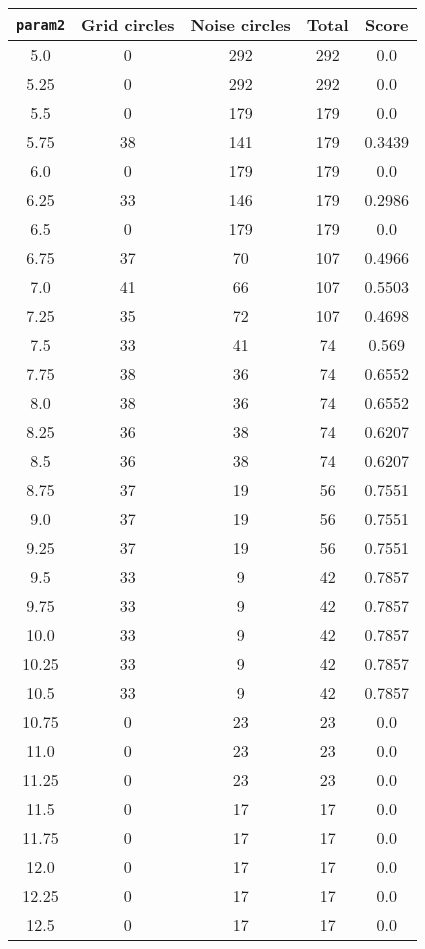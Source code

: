 \documentclass[letterpaper, 12pt]{article}
\begin{document}
\begin{longtable}{|c|c|c|c|c|}
\hline
\textbf{\texttt{param2}} & \textbf{Grid circles} & \textbf{Noise circles} & \textbf{Total} & \textbf{Score} \\
\hline
5.0 & 0 & 292 & 292 & 0.0 \\
\hline
5.25 & 0 & 292 & 292 & 0.0 \\
\hline
5.5 & 0 & 179 & 179 & 0.0 \\
\hline
5.75 & 38 & 141 & 179 & 0.3439 \\
\hline
6.0 & 0 & 179 & 179 & 0.0 \\
\hline
6.25 & 33 & 146 & 179 & 0.2986 \\
\hline
6.5 & 0 & 179 & 179 & 0.0 \\
\hline
6.75 & 37 & 70 & 107 & 0.4966 \\
\hline
7.0 & 41 & 66 & 107 & 0.5503 \\
\hline
7.25 & 35 & 72 & 107 & 0.4698 \\
\hline
7.5 & 33 & 41 & 74 & 0.569 \\
\hline
7.75 & 38 & 36 & 74 & 0.6552 \\
\hline
8.0 & 38 & 36 & 74 & 0.6552 \\
\hline
8.25 & 36 & 38 & 74 & 0.6207 \\
\hline
8.5 & 36 & 38 & 74 & 0.6207 \\
\hline
8.75 & 37 & 19 & 56 & 0.7551 \\
\hline
9.0 & 37 & 19 & 56 & 0.7551 \\
\hline
9.25 & 37 & 19 & 56 & 0.7551 \\
\hline
9.5 & 33 & 9 & 42 & 0.7857 \\
\hline
9.75 & 33 & 9 & 42 & 0.7857 \\
\hline
10.0 & 33 & 9 & 42 & 0.7857 \\
\hline
10.25 & 33 & 9 & 42 & 0.7857 \\
\hline
10.5 & 33 & 9 & 42 & 0.7857 \\
\hline
10.75 & 0 & 23 & 23 & 0.0 \\
\hline
11.0 & 0 & 23 & 23 & 0.0 \\
\hline
11.25 & 0 & 23 & 23 & 0.0 \\
\hline
11.5 & 0 & 17 & 17 & 0.0 \\
\hline
11.75 & 0 & 17 & 17 & 0.0 \\
\hline
12.0 & 0 & 17 & 17 & 0.0 \\
\hline
12.25 & 0 & 17 & 17 & 0.0 \\
\hline
12.5 & 0 & 17 & 17 & 0.0 \\

\end{longtable}
\end{document}
